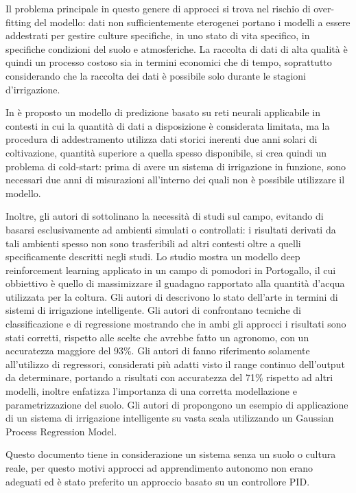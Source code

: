 \documentclass[12pt,a4paper,openright,twoside]{book}
\begin{document}
Il problema principale in questo genere di approcci si trova nel rischio di over-fitting del modello: dati non sufficientemente eterogenei portano i modelli a essere addestrati per gestire culture specifiche, in uno stato di vita specifico, in specifiche condizioni del suolo e atmosferiche.
La raccolta di dati di alta qualità è quindi un processo costoso sia in termini economici che di tempo, soprattutto considerando che la raccolta dei dati è possibile solo durante le stagioni d'irrigazione.

In \cite{Gonzalez2019} è proposto un modello di predizione basato su reti neurali applicabile in contesti in cui la quantità di dati a disposizione è considerata limitata, ma la procedura di addestramento utilizza dati storici inerenti due anni solari di coltivazione, quantità superiore a quella spesso disponibile, si crea quindi un problema di cold-start: prima di avere un sistema di irrigazione in funzione, sono necessari due anni di misurazioni all'interno dei quali non è possibile utilizzare il modello.

Inoltre, gli autori di \cite{Silva2020} sottolinano la necessità di studi sul campo, evitando di basarsi esclusivamente ad ambienti simulati o controllati: i risultati derivati da tali ambienti spesso non sono trasferibili ad altri contesti oltre a quelli specificamente descritti negli studi.
Lo studio \cite{Alibaei2022} mostra un modello deep reinforcement learning applicato in un campo di pomodori in Portogallo, il cui obbiettivo è quello di massimizzare il guadagno rapportato alla quantità d'acqua utilizzata per la coltura.  Gli autori di \cite{García2020, Emmanuel2022} descrivono lo stato dell'arte in termini di sistemi di irrigazione intelligente.
Gli autori di \cite{Goldstein2017} confrontano tecniche di classificazione e di regressione mostrando che in ambi gli approcci i risultati sono stati corretti, rispetto alle scelte che avrebbe fatto un agronomo, con un accuratezza maggiore del 93\%. Gli autori di \cite{Sidhu2020} fanno riferimento solamente all'utilizzo di regressori, considerati più adatti visto il range continuo dell'output da determinare, portando a risultati con accuratezza del 71\% rispetto ad altri modelli, inoltre enfatizza l'importanza di una corretta modellazione e parametrizzazione del suolo. Gli autori di \cite{Emami2022} propongono un esempio di applicazione di un sistema di irrigazione intelligente su vasta scala utilizzando un Gaussian Process Regression Model.

Questo documento tiene in considerazione un sistema senza un suolo o cultura reale, per questo motivi approcci ad apprendimento autonomo non erano adeguati ed è stato preferito un approccio basato su un controllore \ac{PID}.
\end{document}
